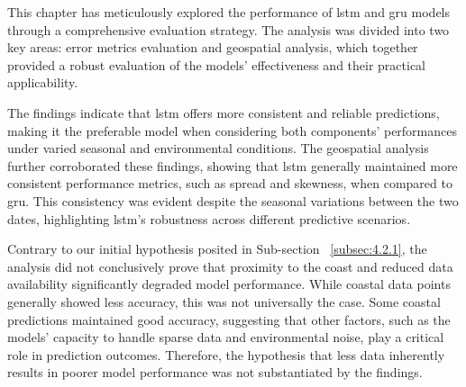 This chapter has meticulously explored the performance of \acrshort{lstm} and \acrshort{gru} models through a comprehensive evaluation strategy. The analysis was divided into two key areas: error metrics evaluation and geospatial analysis, which together provided a robust evaluation of the models' effectiveness and their practical applicability. 

The findings indicate that \acrshort{lstm} offers more consistent and reliable predictions, making it the preferable model when considering both components' performances under varied seasonal and environmental conditions. The geospatial analysis further corroborated these findings, showing that \acrshort{lstm} generally maintained more consistent performance metrics, such as spread and skewness, when compared to \acrshort{gru}. This consistency was evident despite the seasonal variations between the two dates, highlighting \acrshort{lstm}'s robustness across different predictive scenarios.

Contrary to our initial hypothesis posited in Sub-section ~\ref{subsec:4.2.1}, the analysis did not conclusively prove that proximity to the coast and reduced data availability significantly degraded model performance. While coastal data points generally showed less accuracy, this was not universally the case. Some coastal predictions maintained good accuracy, suggesting that other factors, such as the models' capacity to handle sparse data and environmental noise, play a critical role in prediction outcomes. Therefore, the hypothesis that less data inherently results in poorer model performance was not substantiated by the findings.
